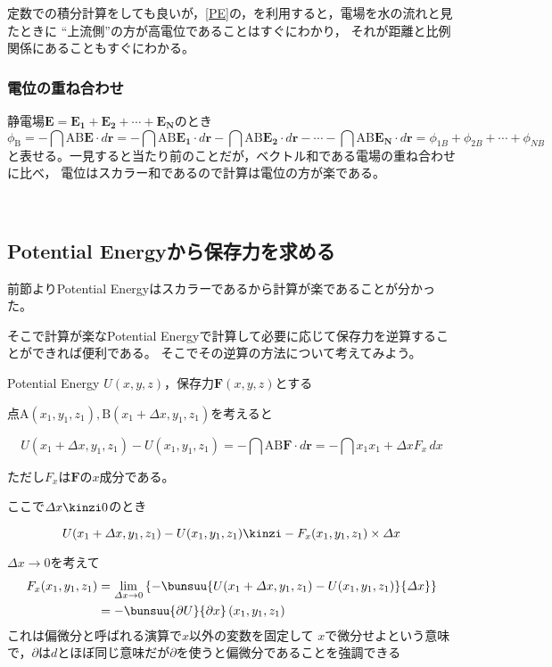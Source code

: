    定数での積分計算をしても良いが，\ref{PE}の，を利用すると，電場を水の流れと見たときに
   “上流側”の方が高電位であることはすぐにわかり，
   それが距離と比例関係にあることもすぐにわかる。

   \subsubsection{電位の重ね合わせ}

   静電場$\bm E=\bm{E_1}+\bm{E_2}+\cdots +\bm{E_N}$のとき
   $$\phi _\text{B}=-\dint{\mathrm A}{\mathrm B}\bm E\cdot d\bm r=%
   -\dint{\mathrm A}{\mathrm B}\bm{E_1}\cdot d\bm r%
   -\dint{\mathrm A}{\mathrm B}\bm{E_2}\cdot d\bm r%
   -\cdots -\dint{\mathrm A}{\mathrm B}\bm{E_N}\cdot d\bm r
   =\phi_{1B}+\phi_{2B}+\cdots+\phi_{NB}$$
   と表せる。一見すると当たり前のことだが，ベクトル和である電場の重ね合わせに比べ，
   電位はスカラー和であるので計算は電位の方が楽である。

   ﻿\subsection{Potential Energyから保存力を求める}

   前節よりPotential Energyはスカラーであるから計算が楽であることが分かった。

   そこで計算が楽なPotential Energyで計算して必要に応じて保存力を逆算することができれば便利である。
   そこでその逆算の方法について考えてみよう。

   Potential Energy $U(x, y,z)$，保存力$\bm F(x, y, z)$とする

   点$\mathrm{A}(x_1,y_1,z_1), \mathrm{B}(x_1+\varDelta x,y_1,z_1)$を考えると

   $$U(x_1+\varDelta x,y_1,z_1)-U(x_1,y_1,z_1)=-\dint{\mathrm A}{\mathrm B}\bm F\cdot d\bm r=-\dint{x_1}{x_1+\varDelta x}F_x\,dx$$

   ただし$F_x$は$\bm F$の$x$成分である。

   ここで$\varDelta x\kinzi 0$のとき

   $$U(x_1+\varDelta x,y_1,z_1)-U(x_1,y_1,z_1)\kinzi -F_x(x_1,y_1,z_1)\times\varDelta x$$

   $\varDelta x\longrightarrow 0$を考えて
   \begin{align*}
    F_x(x_1,y_1,z_1)&=\lim_{\varDelta x\to 0}\left\{-\bunsuu{U(x_1+\varDelta x,y_1,z_1)-U(x_1,y_1,z_1)}{\varDelta x}\right\}\\
    {}&=-\bunsuu{\partial U}{\partial x}\,(x_1,y_1,z_1)
   \end{align*}
   これは偏微分と呼ばれる演算で$x$以外の変数を固定して%
   $x$で微分せよという意味で，$\partial$は$d$とほぼ同じ意味だが$\partial$を使うと偏微分であることを強調できる


